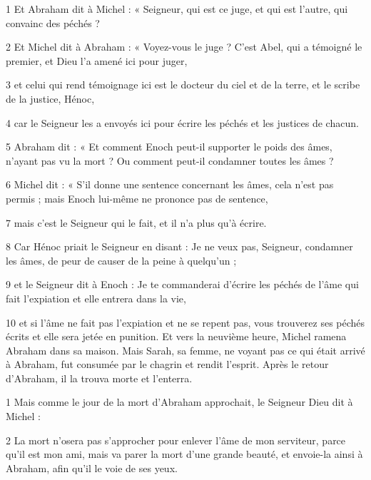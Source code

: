 
\par 1 Et Abraham dit à Michel : « Seigneur, qui est ce juge, et qui est l'autre, qui convainc des péchés ?

\par 2 Et Michel dit à Abraham : « Voyez-vous le juge ? C'est Abel, qui a témoigné le premier, et Dieu l'a amené ici pour juger,

\par 3 et celui qui rend témoignage ici est le docteur du ciel et de la terre, et le scribe de la justice, Hénoc,

\par 4 car le Seigneur les a envoyés ici pour écrire les péchés et les justices de chacun.

\par 5 Abraham dit : « Et comment Enoch peut-il supporter le poids des âmes, n'ayant pas vu la mort ? Ou comment peut-il condamner toutes les âmes ?

\par 6 Michel dit : « S'il donne une sentence concernant les âmes, cela n'est pas permis ; mais Enoch lui-même ne prononce pas de sentence,

\par 7 mais c'est le Seigneur qui le fait, et il n'a plus qu'à écrire.

\par 8 Car Hénoc priait le Seigneur en disant : Je ne veux pas, Seigneur, condamner les âmes, de peur de causer de la peine à quelqu'un ;

\par 9 et le Seigneur dit à Enoch : Je te commanderai d'écrire les péchés de l'âme qui fait l'expiation et elle entrera dans la vie,

\par 10 et si l'âme ne fait pas l'expiation et ne se repent pas, vous trouverez ses péchés écrits et elle sera jetée en punition. Et vers la neuvième heure, Michel ramena Abraham dans sa maison. Mais Sarah, sa femme, ne voyant pas ce qui était arrivé à Abraham, fut consumée par le chagrin et rendit l'esprit. Après le retour d'Abraham, il la trouva morte et l'enterra.


\par 1 Mais comme le jour de la mort d'Abraham approchait, le Seigneur Dieu dit à Michel :

\par 2 La mort n'osera pas s'approcher pour enlever l'âme de mon serviteur, parce qu'il est mon ami, mais va parer la mort d'une grande beauté, et envoie-la ainsi à Abraham, afin qu'il le voie de ses yeux.

